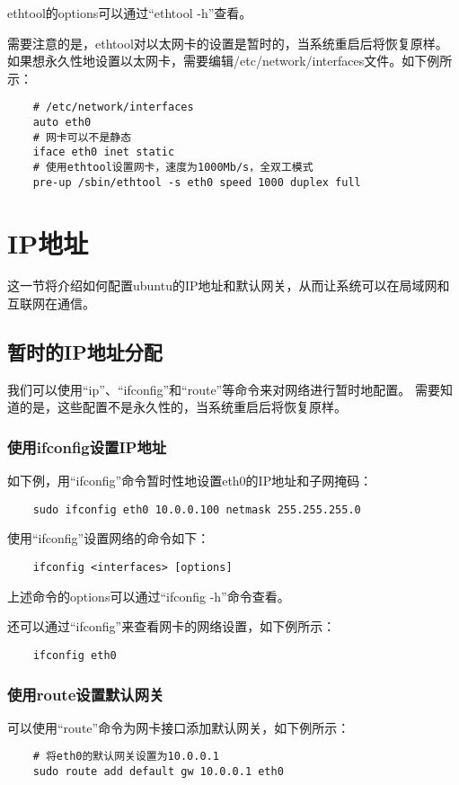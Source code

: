 \documentclass[a4paper,left=2.5cm,right=2.5cm,11pt]{article}
\begin{document}
	ethtool的options可以通过“ethtool -h”查看。\par

	需要注意的是，ethtool对以太网卡的设置是暂时的，当系统重启后将恢复原样。
	如果想永久性地设置以太网卡，需要编辑/etc/network/interfaces文件。如下例所示：
	\begin{lstlisting}
	# /etc/network/interfaces
	auto eth0
	# 网卡可以不是静态
	iface eth0 inet static
	# 使用ethtool设置网卡，速度为1000Mb/s，全双工模式
	pre-up /sbin/ethtool -s eth0 speed 1000 duplex full
	\end{lstlisting}

\section{IP地址}
	这一节将介绍如何配置ubuntu的IP地址和默认网关，从而让系统可以在局域网和互联网在通信。

\subsection{暂时的IP地址分配}
	我们可以使用“ip”、“ifconfig”和“route”等命令来对网络进行暂时地配置。
	需要知道的是，这些配置不是永久性的，当系统重启后将恢复原样。\par

\subsubsection{使用ifconfig设置IP地址}

	如下例，用“ifconfig”命令暂时性地设置eth0的IP地址和子网掩码：
	\begin{lstlisting}
	sudo ifconfig eth0 10.0.0.100 netmask 255.255.255.0
	\end{lstlisting}

	使用“ifconfig”设置网络的命令如下：
	\begin{lstlisting}
	ifconfig <interfaces> [options]
	\end{lstlisting}

	上述命令的options可以通过“ifconfig -h”命令查看。\par

	还可以通过“ifconfig”来查看网卡的网络设置，如下例所示：
	\begin{lstlisting}
	ifconfig eth0
	\end{lstlisting}

\subsubsection{使用route设置默认网关}
	可以使用“route”命令为网卡接口添加默认网关，如下例所示：
	\begin{lstlisting}
	# 将eth0的默认网关设置为10.0.0.1
	sudo route add default gw 10.0.0.1 eth0
	\end{lstlisting}
\end{document}
